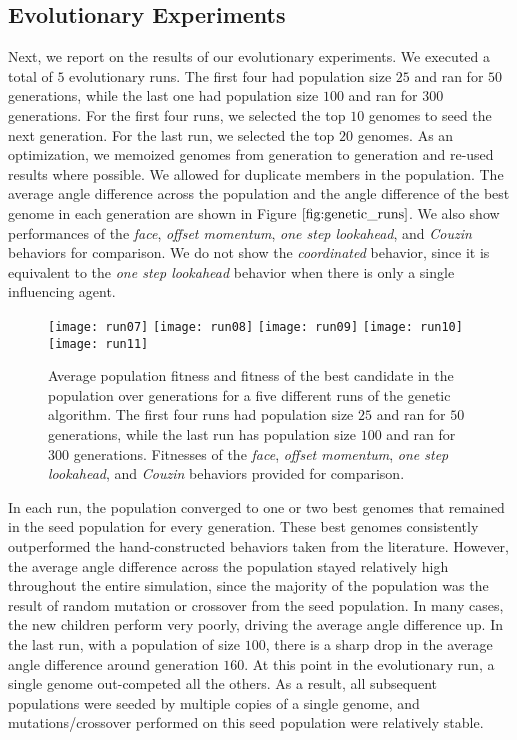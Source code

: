 \subsection{Evolutionary Experiments}
Next, we report on the results of our evolutionary experiments.
We executed a total of $5$ evolutionary runs.
The first four had population size $25$ and ran for $50$ generations, while the
last one had population size $100$ and ran for $300$ generations.
For the first four runs, we selected the top $10$ genomes to seed the next
generation.
For the last run, we selected the top $20$ genomes.
As an optimization, we memoized genomes from generation to generation and re-used
results where possible.
We allowed for duplicate members in the population.
The average angle difference across the population and the angle difference of
the best genome in each generation are shown in Figure $\ref{fig:genetic_runs}$.
We also show performances of the \textit{face}, \textit{offset momentum},
\textit{one step lookahead}, and \textit{Couzin} behaviors for comparison.
We do not show the \textit{coordinated} behavior, since it is equivalent
to the \textit{one step lookahead} behavior when there is only a single
influencing agent.
\begin{figure}
    \centering
    \texttt{[image: run07]}
    \texttt{[image: run08]}
    \texttt{[image: run09]}
    \texttt{[image: run10]}
    \texttt{[image: run11]}
    \caption{Average population fitness and fitness of the best candidate in the
    population over generations for a five different runs of the genetic algorithm.
    The first four runs had population size $25$ and ran for $50$ generations,
    while the last run has population size $100$ and ran for $300$ generations.
    Fitnesses of the \textit{face}, \textit{offset momentum}, \textit{one step
    lookahead}, and \textit{Couzin} behaviors provided for comparison.}
    \label{fig:genetic_runs}
\end{figure}

In each run, the population converged to one or two best genomes that remained
in the seed population for every generation.
These best genomes consistently outperformed the hand-constructed behaviors
taken from the literature.
However, the average angle difference across the population stayed relatively
high throughout the entire simulation, since the majority of the population
was the result of random mutation or crossover from the seed population.
In many cases, the new children perform very poorly, driving the average angle
difference up.
In the last run, with a population of size $100$, there is a sharp drop in the
average angle difference around generation $160$.
At this point in the evolutionary run, a single genome out-competed all the
others.
As a result, all subsequent populations were seeded by multiple copies of a
single genome, and mutations/crossover performed on this seed population
were relatively stable.

